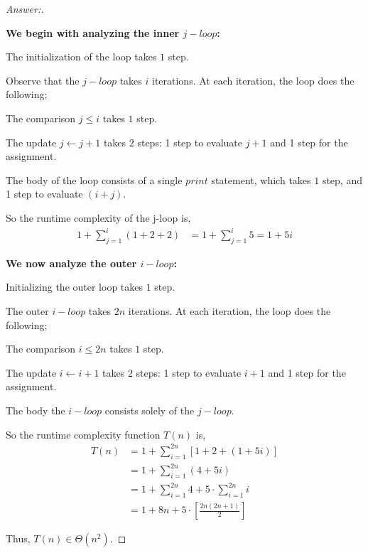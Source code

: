 \documentclass[11pt]{article}
\theoremstyle{definition}
\theoremstyle{definition}
\theoremstyle{definition}
\begin{document}
\begin{proof}[Answer:] \
\item \textbf{We begin with analyzing the inner $j-loop$:}
\item The initialization of the loop takes $1$ step.
\item Observe that the $j-loop$ takes $i$ iterations. At each iteration, the loop does the following;
\item \hspace*{10mm} The comparison $j \leq i$ takes $1$ step.
\item \hspace*{10mm} The update $j \leftarrow j + 1$ takes $2$ steps: 1 step to evaluate $j + 1$ and 1 step for the assignment.
\item \hspace*{10mm} The body of the loop consists of a single $print$ statement, which takes $1$ step, and 1 step to evaluate $(i + j)$.
\item So the runtime complexity of the j-loop is,
\begin{align*}
1 + \sum_{j=1}^{i} (1 + 2 + 2) &= 1 +  \sum_{j=1}^{i} 5 = 1 + 5i
\end{align*}

\item \textbf{We now analyze the outer $i-loop$:}
\item Initializing the outer loop takes $1$ step.
\item The outer $i-loop$ takes $2n$ iterations. At each iteration, the loop does the following;
\item \hspace*{10mm} The comparison $i \leq 2n$ takes $1$ step.
\item \hspace*{10mm} The update $i \leftarrow i + 1$ takes $2$ steps: 1 step to evaluate $i + 1$ and 1 step for the assignment.
\item \hspace*{10mm} The body the $i-loop$ consists solely of the $j-loop$.
\item So the runtime complexity function $T(n)$ is,
\begin{align*}
T(n) &= 1 + \sum_{i=1}^{2n} [1 + 2 + (1 + 5i)] \\
&= 1 + \sum_{i=1}^{2n} (4 + 5i) \\
&=  1 + \sum_{i=1}^{2n} 4 + 5 \cdot \sum_{i=1}^{2n} i \\
&=  1 + 8n + 5 \cdot [\frac{2n(2n + 1)}{2}]
\end{align*}

\item Thus, \color{red}$T(n) \in \Theta(n^{2})$.

\end{proof}



\end{document}
